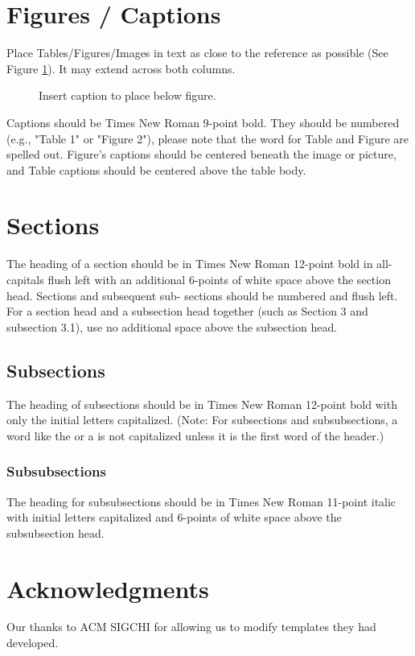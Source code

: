 \documentclass{sig-alternate-br}
\begin{document}
\section{Figures / Captions}
Place Tables/Figures/Images in text as close to the reference as possible 
(See Figure \ref{fig:abc}).  It may extend across both columns. 

\begin{figure}
\centering 
{} 
\caption{Insert caption to place below figure.}
\label{fig:abc} %
\end{figure}

Captions should be Times New Roman 9-point bold.  They should be numbered (e.g., "Table 1" or "Figure 2"), please note that the word for Table and Figure are spelled out. Figure's captions should be centered beneath the image or picture, and Table captions should be centered above the table body.

\section{Sections}
The heading of a section should be in Times New Roman 12-point bold in all-capitals flush left with an additional 6-points of white space above the section head.  Sections and subsequent sub- sections should be numbered and flush left. For a section head and a subsection head together (such as Section 3 and subsection 3.1), use no additional space above the subsection head.

\subsection{Subsections}
The heading of subsections should be in Times New Roman 12-point bold with only the initial letters capitalized. (Note: For subsections and subsubsections, a word like the or a is not capitalized unless it is the first word of the header.)

\subsubsection{Subsubsections}
The heading for subsubsections should be in Times New Roman 11-point italic with initial letters capitalized and 6-points of white space above the subsubsection head.

\section{Acknowledgments}
Our thanks to ACM SIGCHI for allowing us to modify templates they had developed.
\end{document}
